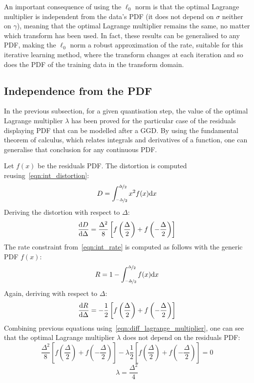 \documentclass[11pt,a4paper,openright,twoside]{book}
\numberwithin{equation}{section} %
\numberwithin{figure}{section} %
\numberwithin{table}{section} %
\begin{document}
An important consequence of using the $\ell_0$ norm is that the optimal
Lagrange multiplier is independent from the data's \ac{PDF} (it does
not depend on $\sigma$ neither on $\gamma$), meaning that the optimal
Lagrange multiplier remains the same, no matter which transform has been
used.
In fact, these results can be generalised to any \ac{PDF}, making the
$\ell_0$ norm a robust approximation of the rate, suitable for this
iterative learning method, where the transform changes at each iteration
and so does the \ac{PDF} of the training data in the transform domain.

\subsection{Independence from the \ac{PDF}}
\label{sub:independence_from_the_pdf}

In the previous subsection, for a given quantisation step, the value of
the optimal Lagrange multiplier $\lambda$ has been proved for the
particular case of the residuals displaying \ac{PDF} that can be
modelled after a \ac{GGD}.
By using the fundamental theorem of calculus, which relates integrals
and derivatives of a function, one can generalise that conclusion for
any continuous \ac{PDF}.

Let $f(x)$ be the residuals \ac{PDF}.
The distortion is computed reusing~\eqref{eqn:int_distortion}:
\begin{equation}
	D = \int_{\nicefrac{-\Delta}{2}}^{\nicefrac{\Delta}{2}} x^2 f(x) \text{d} x
\end{equation}
Deriving the distortion with respect to $\Delta$:
\begin{equation}
	\frac{\text{d} D}{\text{d} \Delta} =
	\frac{\Delta^2}{8}\left[
	f\left(\frac{\Delta}{2}\right)+f\left(-\frac{\Delta}{2}\right)\right]
\end{equation}
The rate constraint from~\eqref{eqn:int_rate} is computed as
follows with the generic \ac{PDF}
$f(x)$:
\begin{equation}
	R = 1 - \int_{\nicefrac{-\Delta}{2}}^{\nicefrac{\Delta}{2}} f(x) \text{d} x\\
\end{equation}
Again, deriving with respect to $\Delta$:
\begin{equation}
	\frac{\text{d} R}{\text{d} \Delta} =
	-\frac{1}{2}\left[
	f\left(\frac{\Delta}{2}\right)+
	f\left(-\frac{\Delta}{2}\right)\right]
\end{equation}
Combining previous equations using~\eqref{eqn:diff_lagrange_multiplier},
one can see that the optimal Lagrange multiplier $\lambda$ does not
depend on the residuals \ac{PDF}:
\begin{equation}
	\frac{\Delta^2}{8}\left[
	f\left(\frac{\Delta}{2}\right)+f\left(-\frac{\Delta}{2}\right)\right]
	- \lambda
	\frac{1}{2}\left[
	f\left(\frac{\Delta}{2}\right)+
	f\left(-\frac{\Delta}{2}\right)\right] = 0
\end{equation}
\begin{equation}
	\boxed{\lambda = \frac{\Delta^2}{4}}
\end{equation}
\end{document}
